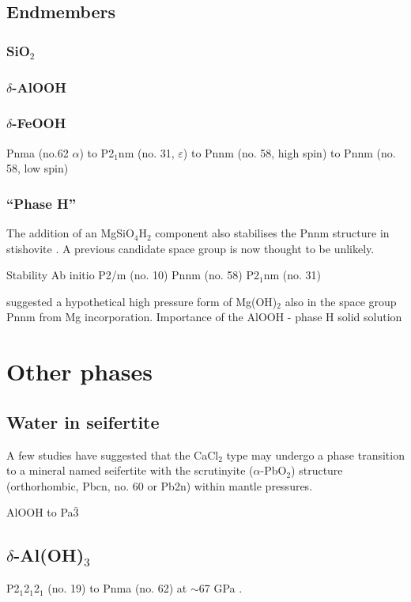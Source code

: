 \documentclass[review]{elsarticle}
\begin{document}
\subsection{Endmembers}
\subsubsection{SiO$_2$}

\subsubsection{$\delta$-AlOOH}

\subsubsection{$\delta$-FeOOH}
Pnma (no.62 $\alpha$) to P2$_{1}$nm (no. 31, $\varepsilon$) \citep{GJK2008} to Pnnm (no. 58, high spin) to Pnnm (no. 58, low spin) \citep{GQSPM2013}

\subsubsection{``Phase H''}
The addition of an MgSiO$_4$H$_2$ component also stabilises the Pnnm structure in stishovite \citep{KSK2011}. A previous candidate space group \citep[Pnn2; no. 34][]{KKSOK2004} is now thought to be unlikely.

Stability \citep{OAKSH2014}
Ab initio P2/m (no. 10) \citep{Tsuchiya2013}
Pnnm (no. 58) \citep{BNTI2014}
P2$_1$nm (no. 31) \citep{NITTNFH2014}

\cite{KKSOK2004} suggested a hypothetical high pressure form of Mg(OH)$_2$ also in the space group Pnnm from Mg incorporation.
Importance of the AlOOH - phase H solid solution \cite{OOSMHON2014}

\section{Other phases}
\subsection{Water in seifertite}
A few studies have suggested that the CaCl$_2$ type may undergo a phase transition to a mineral named seifertite with the scrutinyite ($\alpha$-PbO$_2$) structure (orthorhombic, Pbcn, no. 60 or Pb2n) within mantle pressures.

AlOOH to Pa$\bar{3}$ \citep{TT2011}

\subsection{$\delta$-Al(OH)$_3$}
P2$_1$2$_1$2$_1$ (no. 19) to Pnma (no. 62) at $\sim$67 GPa \cite{MKISGY2011}.
\cite{XK2007}
\end{document}
